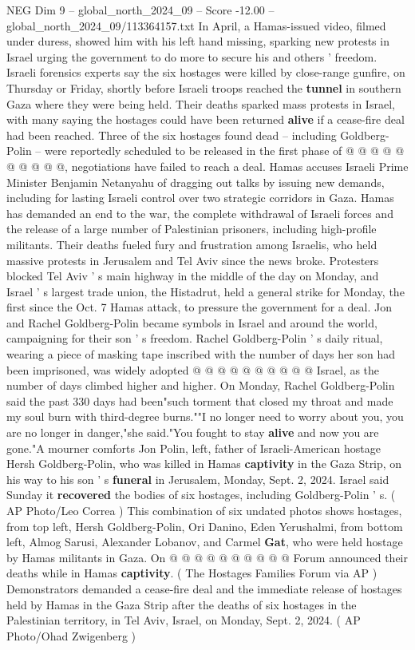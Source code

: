 \begin{textsample}{NEG Dim 9 – global\_north\_2024\_09 – Score -12.00 – global\_north\_2024\_09/113364157.txt}
In April, a Hamas-issued video, filmed under duress, showed him with his left hand missing, sparking new protests in Israel urging the government to do more to secure his and others ' freedom.
Israeli forensics experts say the six hostages were killed by close-range gunfire, on Thursday or Friday, shortly before Israeli troops reached the \textbf{tunnel} in southern Gaza where they were being held.
Their deaths sparked mass protests in Israel, with many saying the hostages could have been returned \textbf{alive} if a cease-fire deal had been reached.
Three of the six hostages found dead -- including Goldberg-Polin -- were reportedly scheduled to be released in the first phase of @ @ @ @ @ @ @ @ @ @, negotiations have failed to reach a deal.
Hamas accuses Israeli Prime Minister Benjamin Netanyahu of dragging out talks by issuing new demands, including for lasting Israeli control over two strategic corridors in Gaza.
Hamas has demanded an end to the war, the complete withdrawal of Israeli forces and the release of a large number of Palestinian prisoners, including high-profile militants.
Their deaths fueled fury and frustration among Israelis, who held massive protests in Jerusalem and Tel Aviv since the news broke.
Protesters blocked Tel Aviv ' s main highway in the middle of the day on Monday, and Israel ' s largest trade union, the Histadrut, held a general strike for Monday, the first since the Oct. 7 Hamas attack, to pressure the government for a deal.
Jon and Rachel Goldberg-Polin became symbols in Israel and around the world, campaigning for their son ' s freedom.
Rachel Goldberg-Polin ' s daily ritual, wearing a piece of masking tape inscribed with the number of days her son had been imprisoned, was widely adopted @ @ @ @ @ @ @ @ @ @ Israel, as the number of days climbed higher and higher.
On Monday, Rachel Goldberg-Polin said the past 330 days had been"such torment that closed my throat and made my soul burn with third-degree burns.""I no longer need to worry about you, you are no longer in danger,"she said."You fought to stay \textbf{alive} and now you are gone."A mourner comforts Jon Polin, left, father of Israeli-American hostage Hersh Goldberg-Polin, who was killed in Hamas \textbf{captivity} in the Gaza Strip, on his way to his son ' s \textbf{funeral} in Jerusalem, Monday, Sept. 2, 2024.
Israel said Sunday it \textbf{recovered} the bodies of six hostages, including Goldberg-Polin ' s. ( AP Photo/Leo Correa ) This combination of six undated photos shows hostages, from top left, Hersh Goldberg-Polin, Ori Danino, Eden Yerushalmi, from bottom left, Almog Sarusi, Alexander Lobanov, and Carmel \textbf{Gat}, who were held hostage by Hamas militants in Gaza.
On @ @ @ @ @ @ @ @ @ @ Forum announced their deaths while in Hamas \textbf{captivity}. ( The Hostages Families Forum via AP ) Demonstrators demanded a cease-fire deal and the immediate release of hostages held by Hamas in the Gaza Strip after the deaths of six hostages in the Palestinian territory, in Tel Aviv, Israel, on Monday, Sept. 2, 2024. ( AP Photo/Ohad Zwigenberg )

\end{textsample}
